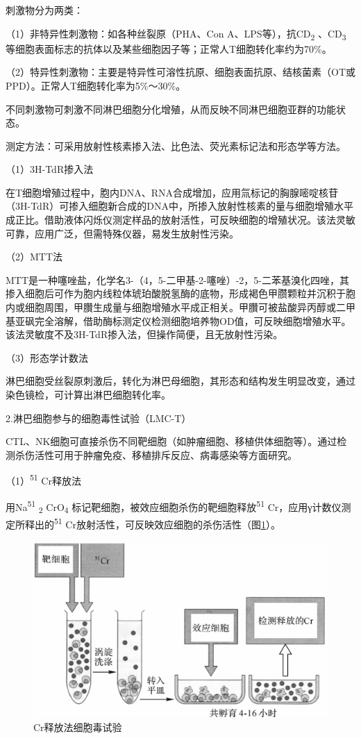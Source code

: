 刺激物分为两类：

（1）非特异性刺激物：如各种丝裂原（PHA、Con
A、LPS等），抗CD\textsubscript{2} 、CD\textsubscript{3}
等细胞表面标志的抗体以及某些细胞因子等；正常人T细胞转化率约为70\%。

（2）特异性刺激物：主要是特异性可溶性抗原、细胞表面抗原、结核菌素（OT或PPD）。正常人T细胞转化率为5\%～30\%。

不同刺激物可刺激不同淋巴细胞分化增殖，从而反映不同淋巴细胞亚群的功能状态。

测定方法：可采用放射性核素掺入法、比色法、荧光素标记法和形态学等方法。

（1）3H-TdR掺入法

在T细胞增殖过程中，胞内DNA、RNA合成增加，应用氚标记的胸腺嘧啶核苷（3H-TdR）可掺入细胞新合成的DNA中，所掺入放射性核素的量与细胞增殖水平成正比。借助液体闪烁仪测定样品的放射活性，可反映细胞的增殖状况。该法灵敏可靠，应用广泛，但需特殊仪器，易发生放射性污染。

（2）MTT法

MTT是一种噻唑盐，化学名3-（4，5-二甲基-2-噻唑）-2，5-二苯基溴化四唑，其掺入细胞后可作为胞内线粒体琥珀酸脱氢酶的底物，形成褐色甲臜颗粒并沉积于胞内或细胞周围，甲臢生成量与细胞增殖水平成正相关。甲臢可被盐酸异丙醇或二甲基亚砜完全溶解，借助酶标测定仪检测细胞培养物OD值，可反映细胞增殖水平。该法灵敏度不及3H-TdR掺入法，但操作简便，且无放射性污染。

（3）形态学计数法

淋巴细胞受丝裂原刺激后，转化为淋巴母细胞，其形态和结构发生明显改变，通过染色镜检，可计算出淋巴细胞转化率。

2.淋巴细胞参与的细胞毒性试验（LMC-T）

CTL、NK细胞可直接杀伤不同靶细胞（如肿瘤细胞、移植供体细胞等）。通过检测杀伤活性可用于肿瘤免疫、移植排斥反应、病毒感染等方面研究。

（1）\textsuperscript{51} Cr释放法

用Na\textsuperscript{51} \textsubscript{2} CrO\textsubscript{4}
标记靶细胞，被效应细胞杀伤的靶细胞释放\textsuperscript{51}
Cr，应用γ计数仪测定所释出的\textsuperscript{51}
Cr放射活性，可反映效应细胞的杀伤活性（图\ref{fig10-26}）。

\begin{figure}[!htbp]
 \centering
 \includegraphics[width=.6\textwidth]{./images/Image00180.jpg}
 \captionsetup{justification=centering}
 \caption{Cr释放法细胞毒试验}
 \label{fig10-26}
  \end{figure} 

